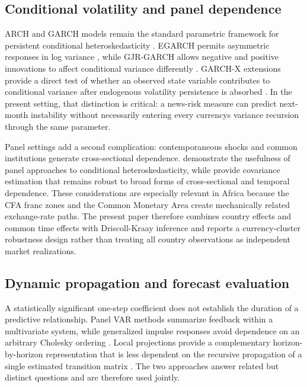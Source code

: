 \documentclass[11pt]{article}
\begin{document}
\subsection{Conditional volatility and panel
dependence}\label{conditional-volatility-and-panel-dependence}

ARCH and GARCH models remain the standard parametric framework for
persistent conditional heteroskedasticity \citep{engle1982,bollerslev1986}. EGARCH permits asymmetric responses in log variance \citep{nelson1991}, while GJR-GARCH allows negative and positive innovations to
affect conditional variance differently \citep{glosten1993}. GARCH-X extensions provide a direct test of whether an
observed state variable contributes to conditional variance after
endogenous volatility persistence is absorbed \citep{francq2019,pedersen2019}. In the present setting, that distinction is
critical: a news-risk measure can predict next-month instability without
necessarily entering every currency\textquotesingle s variance recursion
through the same parameter.

Panel settings add a second complication: contemporaneous shocks and
common institutions generate cross-sectional dependence. \citet{cermeno2006} demonstrate the usefulness of panel approaches to
conditional heteroskedasticity, while \citet{driscoll1998} provide
covariance estimation that remains robust to broad forms of
cross-sectional and temporal dependence. These considerations are
especially relevant in Africa because the CFA franc zones and the Common
Monetary Area create mechanically related exchange-rate paths. The
present paper therefore combines country effects and common time effects
with Driscoll-Kraay inference and reports a currency-cluster robustness
design rather than treating all country observations as independent
market realizations.

\subsection{Dynamic propagation and forecast
evaluation}\label{dynamic-propagation-and-forecast-evaluation}

A statistically significant one-step coefficient does not establish the
duration of a predictive relationship. Panel VAR methods summarize
feedback within a multivariate system, while generalized impulse
responses avoid dependence on an arbitrary Cholesky ordering \citep{pesaran1998}. Local projections provide a complementary
horizon-by-horizon representation that is less dependent on the
recursive propagation of a single estimated transition matrix \citep{jorda2005}. The two approaches answer related but distinct questions and are
therefore used jointly.
\end{document}
